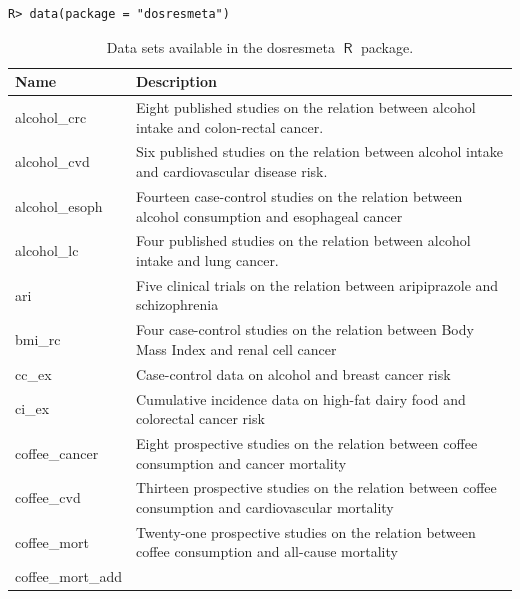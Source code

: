 \documentclass[11pt,a4paper,twoside,openany]{book}\usepackage{knitr}
\newcommand{\pkg}[1]{{\fontseries{b}\selectfont #1}}
\DeclareMathOperator{\R}{\textsf{R}}
\begin{document}
{\begin{knitrout}\footnotesize
{}\color{fgcolor}\begin{kframe}
\begin{verbatim}
R> data(package = "dosresmeta")
\end{verbatim}
\end{kframe}
\end{knitrout}

\begin{knitrout}\footnotesize
{}\color{fgcolor}\begin{table}

\caption{\label{tab:data_table}Data sets available in the \pkg{dosresmeta} $\R$ package.}
\centering
\begin{tabular}[t]{l>{\raggedright\arraybackslash}p{32em}}
\toprule
Name & Description\\
\midrule
alcohol\_crc & Eight published studies on the relation between alcohol intake and colon-rectal cancer.\\
alcohol\_cvd & Six published studies on the relation between alcohol intake and cardiovascular disease risk.\\
alcohol\_esoph & Fourteen case-control studies on the relation between alcohol consumption and esophageal cancer\\
alcohol\_lc & Four published studies on the relation between alcohol intake and lung cancer.\\
ari & Five clinical trials on the relation between aripiprazole and schizophrenia\\
\addlinespace
bmi\_rc & Four case-control studies on the relation between Body Mass Index and renal cell cancer\\
cc\_ex & Case-control data on alcohol and breast cancer risk\\
ci\_ex & Cumulative incidence data on high-fat dairy food and colorectal cancer risk\\
coffee\_cancer & Eight prospective studies on the relation between coffee consumption and cancer mortality\\
coffee\_cvd & Thirteen prospective studies on the relation between coffee consumption and cardiovascular mortality\\
\addlinespace
coffee\_mort & Twenty-one prospective studies on the relation between coffee consumption and all-cause mortality\\
coffee\_mort\_add & \\

\end{tabular}
\end{table}
\end{knitrout}}
\end{document}
